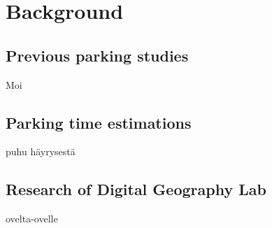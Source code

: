 \section{Background}

\subsection{Previous parking studies}
\justify
Moi

\subsection{Parking time estimations}
\justify
puhu häyrysestä

\subsection{Research of Digital Geography Lab}
\justify
ovelta-ovelle